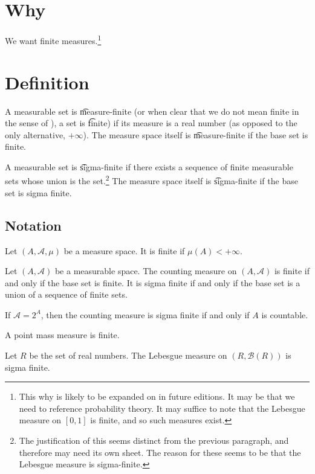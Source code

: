 
\section*{Why}

We want finite measures.\footnote{This why is likely to be expanded on in future editions. It may be that we need to reference probability theory. It may suffice to note that the Lebesgue measure on $[0, 1]$ is finite, and so such measures exist.}

\section*{Definition}

A measurable set is \t{measure-finite} (or when clear that we do not mean finite in the sense of ), a set is \t{finite}) if its measure is a real number (as opposed to the only alternative, $+\infty$).
The measure space itself is \t{measure-finite} if the base set is finite.

A measurable set is \t{sigma-finite} if there exists a sequence of finite measurable sets whose union is the set.\footnote{The justification of this seems distinct from the previous paragraph, and therefore may need its own sheet. The reason for these seems to be that the Lebesgue measure is sigma-finite.}
The measure space itself is \t{sigma-finite} if the base set is sigma finite.

\subsection*{Notation}

Let $(A, \mathcal{A} , \mu )$ be a measure space.
It is finite if $\mu (A) < +\infty$.

\begin{example}
Let $(A, \mathcal{A} )$ be a measurable space.
The counting measure on $(A, \mathcal{A} )$ is
finite if and only if the base set is finite.
It is sigma finite if and only if the base
set is a union of a sequence of finite sets.

If $\mathcal{A}  = 2^A$, then the counting
measure is sigma finite if and only if
$A$ is countable.

\end{example}

\begin{example}
A point mass measure is finite.
\end{example}

\begin{example}
Let $R$ be the set of real numbers.
The Lebesgue measure on
$(R, \mathcal{B} (R))$ is sigma finite.
\end{example}
